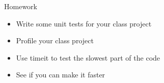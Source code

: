 \documentclass{beamer}
\begin{document}
\begin{frame}[fragile]{Homework}

\begin{itemize}
    \item Write some unit tests for your class project
    \item Profile your class project
    \item Use timeit to test the slowest part of the code
    \item See if you can make it faster
\end{itemize}

\end{frame}
\end{document}
